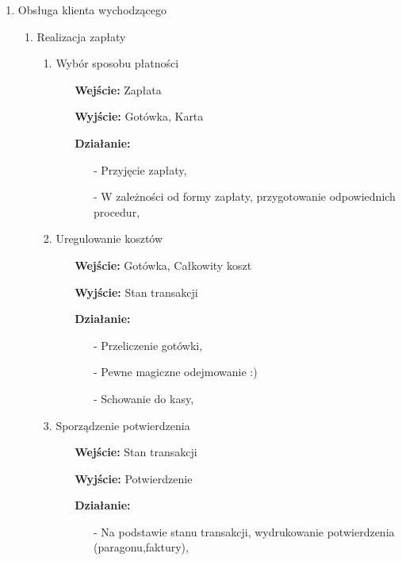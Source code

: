 \documentclass[a4paper, 11pt]{article}
\begin{document}
\begin{enumerate}[label*=\arabic*.]
\begin{enumerate}[label*=\arabic*.]
\begin{enumerate}[label*=\arabic*.]
\begin{itemize}
\begin{itemize}
					\end{itemize}														
				\end{itemize}	
			\end{enumerate}									
			\item Obsługa klienta wychodzącego
			\begin{enumerate}[label*=\arabic*.]
				\item Realizacja zapłaty
				\begin{enumerate}[label*=\arabic*.]
					\item Wybór sposobu płatności
					\begin{itemize}
						\item [\textbf{Wejście:}] Zapłata
						\item [\textbf{Wyjście:}] Gotówka, Karta
						\item [\textbf{Działanie:}] 
						\begin{itemize}
							\item[-] Przyjęcie zapłaty,
							\item[-] W zależności od formy zapłaty, przygotowanie odpowiednich procedur,							
						\end{itemize}
					\end{itemize}
					\item Uregulowanie kosztów
					\begin{itemize}
						\item [\textbf{Wejście:}] Gotówka, Całkowity koszt
						\item [\textbf{Wyjście:}] Stan transakcji
						\item [\textbf{Działanie:}] 
						\begin{itemize}
							\item[-] Przeliczenie gotówki,
							\item[-] Pewne magiczne odejmowanie :)
							\item[-] Schowanie do kasy,							
						\end{itemize}
					\end{itemize}					
					\item Sporządzenie potwierdzenia
					\begin{itemize}
						\item [\textbf{Wejście:}] Stan transakcji
						\item [\textbf{Wyjście:}] Potwierdzenie
						\item [\textbf{Działanie:}] 
						\begin{itemize}
							\item[-] Na podstawie stanu transakcji, wydrukowanie potwierdzenia (paragonu,faktury),

\end{itemize}
\end{itemize}
\end{enumerate}
\end{enumerate}
\end{enumerate}
\end{enumerate}
\end{document}
